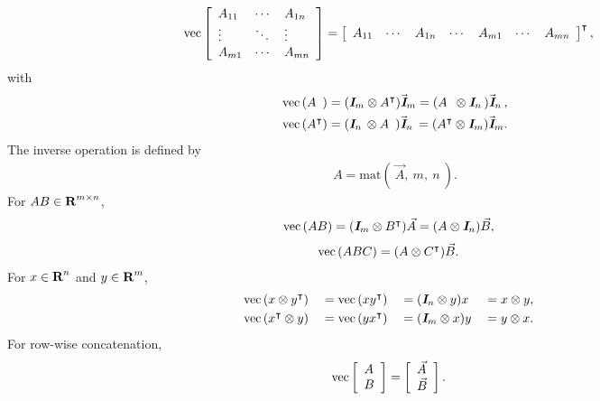\documentclass{article}
\begin{document}
    \begin{align*}
        \mathrm{vec}\left[\begin{array}{lllllllllllllllllll} A_{11} & \cdots & A_{1n}
        \\
        \vdots & \ddots & \vdots
        \\
        A_{m1} & \cdots & A_{mn}\end{array}\right]&=\left[\begin{array}{lllllllllllllllllll}A_{11} & \cdots & A_{1n} & \cdots & A_{m1} & \cdots & A_{mn}\end{array}\right]^\intercal,
    \end{align*}
    with
    \begin{align*}
        \vecf{A^{\phantom{\tp}}} & = (\eye_m \otimes A^\tp)\vec{\eye}_m
        = (A^{\phantom{\tp}} \otimes \eye_{n\:})\vec{\eye}_{n\:},\\
        \vecf{A^\tp} 
        &=(\eye_{n\:} \otimes A^{\phantom{\tp}})\vec{\eye}_{n\:}
        = (A^\tp \otimes \eye_m)\vec{\eye}_m.
    \end{align*}
    The inverse operation is defined by
    \begin{align*}
        A = \mathrm{mat}(\:\vec{A},\:m,\:n\:).
    \end{align*}
    For $AB\in\textbf{R}^{m\times n}$,
    \begin{align*}
        \mathrm{vec}\left(AB\right) &= (\emph{\textbf{I}}_m\otimes B^\intercal)\vec{A}
        = (A\otimes \emph{\textbf{I}}_n)\vec{B},
    \end{align*}
    \begin{align*}
        \mathrm{vec}\left(ABC\right) 
        &= (A\otimes C^\intercal)\vec{B}.
    \end{align*}
    For $x\in\textbf{R}^n$ and $y\in\textbf{R}^m$,
    \begin{align*}
        \quad\quad\quad\quad\quad\quad\quad\quad\quad\quad\quad\quad\quad\quad&
        \mathrm{vec}\left(x\otimes y^\intercal\right)
        &
        &=\mathrm{vec}\left(xy^\intercal\right)
        &
        &=(\emph{\textbf{I}}_n\otimes y)x 
        &
        &=x\otimes y,
        &\quad\quad\quad\quad\quad\quad\quad\quad\quad\quad\quad\quad\quad\quad
        \\
        &
        \mathrm{vec}\left(x^\intercal\otimes y\right)
        &
        &=\mathrm{vec}\left(yx^\intercal\right)
        &
        &=(\emph{\textbf{I}}_m\otimes x)y 
        &
        &=y\otimes x.
        & 
    \end{align*}
    For row-wise concatenation,
    \begin{align*}
        \mathrm{vec}\left[\begin{array}{lllllllllllllllllll}A\\B\end{array}\right]&=\left[\begin{array}{lllllllllllllllllll}\vec{A}\\\vec{B}\end{array}\right].
    \end{align*}
\end{document}
